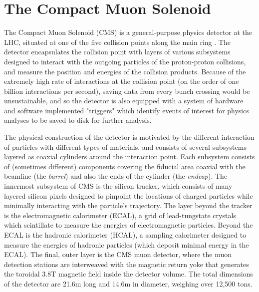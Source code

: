 \section{The Compact Muon Solenoid}
\label{sec:cms}
The Compact Muon Solenoid (CMS) is a general-purpose physics detector at the LHC, situated at one of the five collision points along the main ring \cite{Chatrchyan:2008aa, Bayatian:2006nff}. The detector encapsulates the collision point with layers of various subsystems designed to interact with the outgoing particles of the proton-proton collisions, and measure the position and energies of the collision products. Because of the extremely high rate of interactions at the collision point (on the order of one billion interactions per second), saving data from every bunch crossing would be unsustainable, and so the detector is also equipped with a system of hardware and software implemented "triggers" which identify events of interest for physics analyses to be saved to disk for further analysis.

The physical construction of the detector is motivated by the different interaction of particles with different types of materials, and consists of several subsystems layered as coaxial cylinders around the interaction point. Each subsystem consists of (sometimes different) components covering the fiducial area coaxial with the beamline (the {\it barrel}) and also the ends of the cylinder (the {\it endcap}). The innermost subsystem of CMS is the silicon tracker, which consists of many layered silicon pixels designed to pinpoint the locations of charged particles while minimally interacting with the particle's trajectory. The layer beyond the tracker is the electromagnetic calorimeter (ECAL), a grid of lead-tungstate crystals which scintillate to measure the energies of electromagnetic particles. Beyond the ECAL is the hadronic calorimeter (HCAL), a sampling calorimeter designed to measure the energies of hadronic particles (which deposit minimal energy in the ECAL). The final, outer layer is the CMS muon detector, where the muon detection stations are interweaved with the magnetic return yoke that generates the toroidal 3.8T magnetic field inside the detector volume. The total dimensions of the detector are 21.6m long and 14.6m in diameter, weighing over 12,500 tons.

